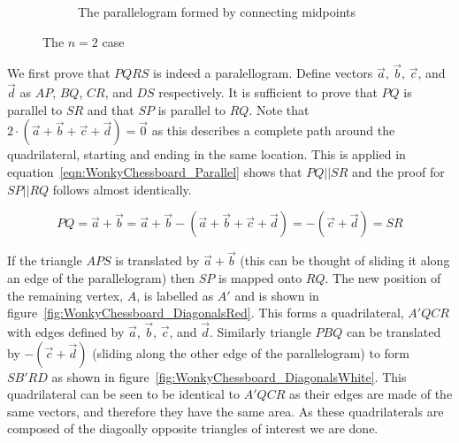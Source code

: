 \begin{figure}[H]
\begin{center}
\begin{subfigure}{0.49\linewidth}
		\caption{The parallelogram formed by connecting midpoints}
		\label{fig:WonkyChessboard_Parallelogram}
		\end{subfigure}
	\end{center}
	\caption{The $n = 2$ case}
	\label{fig:WonkyChessboard_BaseCase}
\end{figure}

We first prove that $PQRS$ is indeed a paralellogram. Define vectors $\vec a$, $\vec b$, $\vec c$, and $\vec d$ as $AP$, $BQ$, $CR$, and $DS$ respectively. It is sufficient to prove that $PQ$ is parallel to $SR$ and that $SP$ is parallel to $RQ$. Note that $2 \cdot (\vec a + \vec b + \vec c + \vec d) = \vec 0$ as this describes a complete path around the quadrilateral, starting and ending in the same location. This is applied in equation~\ref{eqn:WonkyChessboard_Parallel} shows that $PQ || SR$ and the proof for $SP || RQ$ follows almost identically.

\begin{equation}
	PQ = \vec a + \vec b = \vec a + \vec b - (\vec a + \vec b + \vec c + \vec d) = -(\vec c + \vec d) = SR
	\label{eqn:WonkyChessboard_Parallel}
\end{equation}

If the triangle $APS$ is translated by $\vec a + \vec b$ (this can be thought of sliding it along an edge of the parallelogram) then $SP$ is mapped onto $RQ$. The new position of the remaining vertex, $A$, is labelled as $A'$ and is shown in figure~\ref{fig:WonkyChessboard_DiagonalsRed}. This forms a quadrilateral, $A'QCR$ with edges defined by $\vec a$, $\vec b$, $\vec c$, and $\vec d$. Similarly triangle $PBQ$ can be translated by $-(\vec c + \vec d)$ (sliding along the other edge of the parallelogram) to form $SB'RD$ as shown in figure~\ref{fig:WonkyChessboard_DiagonalsWhite}. This quadrilateral can be seen to be identical to $A'QCR$ as their edges are made of the same vectors, and therefore they have the same area. As these quadrilaterals are composed of the diagoally opposite triangles of interest we are done.

